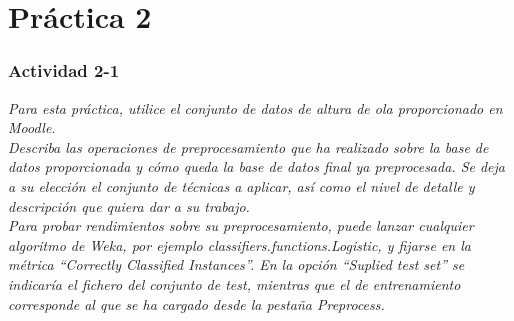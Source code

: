 \part{Práctica 2}
\section{Actividad 2-1}
\label{p21}
\begin{center}
    \parbox{12cm}{\justify\textit{Para esta práctica, utilice el conjunto de datos de altura de ola proporcionado en Moodle.\\
    Describa las operaciones de preprocesamiento que ha realizado sobre la base de datos proporcionada y cómo queda la base de datos final ya preprocesada. Se deja a su elección el conjunto de técnicas a aplicar, así como el nivel de detalle y descripción que quiera dar a su trabajo. \\   
    Para probar rendimientos sobre su preprocesamiento, puede lanzar cualquier algoritmo de Weka, por ejemplo classifiers.functions.Logistic, y fijarse en la métrica ``Correctly Classified Instances''. En la opción ``Suplied test set'' se indicaría el fichero del conjunto de test, mientras que el de entrenamiento corresponde al que se ha cargado desde la pestaña Preprocess.}}
\end{center}


